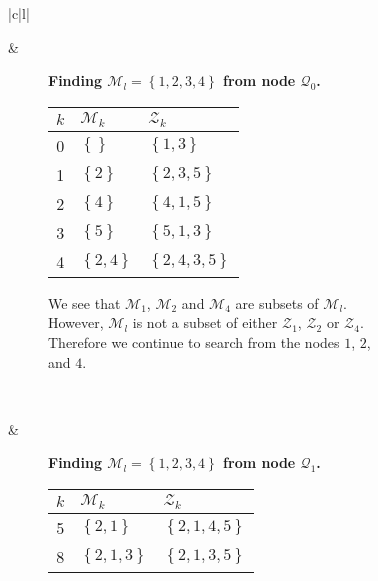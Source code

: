 \begin{figure}[H]
    \centering
    \begin{tabular}[t]{|c|l|}\hline
    \begin{subfigure}[b]{0.35\textwidth}
        \centering
        
    \end{subfigure}
    & 
    \begin{subfigure}[b]{0.64\textwidth}
        \textbf{Finding $\mathcal{M}_l = \left\{{1,2,3,4}\right\}$ from node $\mathcal{Q}_0$.} \\
        \begin{tabular}{rll}
            $k$ & $\mathcal{M}_k$            & $\mathcal{Z}_k$ \\ \hline
            0        & $\left\{{}\right\}$        & $\left\{{1,3}\right\}$ \\ 
            1        & $\left\{{2}\right\}$       & $\left\{{2,3,5}\right\}$ \\ 
            2        & $\left\{{4}\right\}$       & $\left\{{4,1,5}\right\}$ \\ 
            3        & $\left\{{5}\right\}$       & $\left\{{5,1,3}\right\}$ \\ 
            4        & $\left\{{2,4}\right\}$     & $\left\{{2,4,3,5}\right\}$ \\ 
        \end{tabular}

        We see that $\mathcal{M}_1$, $\mathcal{M}_2$ and $\mathcal{M}_4$ are
        subsets of $\mathcal{M}_l$. However, $\mathcal{M}_l$ is not a subset
        of either $\mathcal{Z}_1$, $\mathcal{Z}_2$ or $\mathcal{Z}_4$.
        Therefore we continue to search from the nodes $1$, $2$, and $4$.
    \end{subfigure}
    \\ \hline
    \begin{subfigure}[b]{0.35\textwidth}
        \centering
        
    \end{subfigure}
    & 
    \begin{subfigure}[b]{0.64\textwidth}
        \textbf{Finding $\mathcal{M}_l = \left\{{1,2,3,4}\right\}$ from node $\mathcal{Q}_1$.} \\
        \begin{tabular}{rll}
            $k$ & $\mathcal{M}_k$            & $\mathcal{Z}_k$ \\ \hline
            5        & $\left\{{2,1}\right\}$     & $\left\{{2,1,4,5}\right\}$ \\ 
            8        & $\left\{{2,1,3}\right\}$   & $\left\{{2,1,3,5}\right\}$ \\ 
        \end{tabular}


\end{subfigure}
\end{tabular}
\end{figure}
